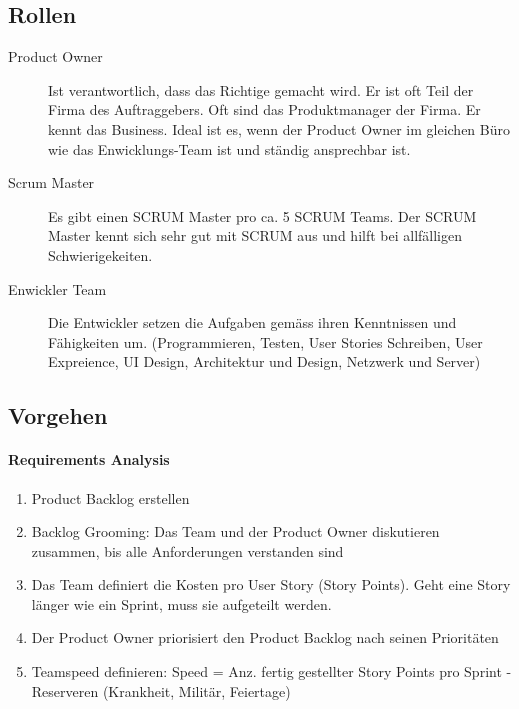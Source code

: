 \subsection{Rollen}
\begin{description}
	\item[Product Owner] Ist verantwortlich, dass das Richtige gemacht wird. Er ist oft Teil der Firma des Auftraggebers. Oft sind das Produktmanager der Firma. Er kennt das Business. Ideal ist es, wenn der Product Owner im gleichen Büro wie das Enwicklungs-Team ist und ständig ansprechbar ist.
	\item[Scrum Master] Es gibt einen SCRUM Master pro ca. 5 SCRUM Teams. Der SCRUM Master kennt sich sehr gut mit SCRUM aus und hilft bei allfälligen Schwierigekeiten.
	\item[Enwickler Team] Die Entwickler setzen die Aufgaben gemäss ihren Kenntnissen und Fähigkeiten um. (Programmieren, Testen, User Stories Schreiben, User Expreience, UI Design, Architektur und Design, Netzwerk und Server)
\end{description}

\clearpage

\subsection{Vorgehen}
\paragraph{Requirements Analysis}
\begin{enumerate}
	\item Product Backlog erstellen
	\item Backlog Grooming: Das Team und der Product Owner diskutieren zusammen, bis alle Anforderungen verstanden sind
	\item Das Team definiert die Kosten pro User Story (Story Points). Geht eine Story länger wie ein Sprint, muss sie aufgeteilt werden.
	\item Der Product Owner priorisiert den Product Backlog nach seinen Prioritäten
	\item Teamspeed definieren: Speed = Anz. fertig gestellter Story Points pro Sprint - Reserveren (Krankheit, Militär, Feiertage)
\end{enumerate}


